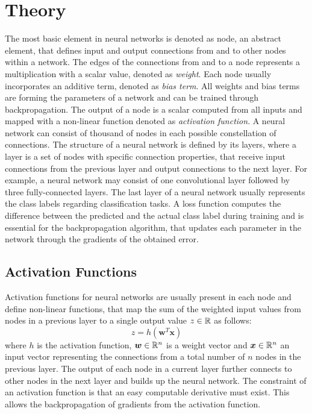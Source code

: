 
\section{Theory}\label{sec:nn_theory}
The most basic element in neural networks is denoted as node, an abstract element, that defines input and output connections from and to other nodes within a network.
The edges of the connections from and to a node represents a multiplication with a scalar value, denoted as \emph{weight}.
Each node usually incorporates an additive term, denoted as \emph{bias term}.
All weights and bias terms are forming the parameters of a network and can be trained through backpropagation.
The output of a node is a scalar computed from all inputs and mapped with a non-linear function denoted as \emph{activation function}.
A neural network can consist of thousand of nodes in each possible constellation of connections.
The structure of a neural network is defined by its layers, where a layer is a set of nodes with specific connection properties, that receive input connections from the previous layer and output connections to the next layer.
For example, a neural network may consist of one convolutional layer followed by three fully-connected layers.
The last layer of a neural network usually represents the class labels regarding classification tasks.
A loss function computes the difference between the predicted and the actual class label during training and is essential for the backpropagation algorithm, that updates each parameter in the network through the gradients of the obtained error.



\subsection{Activation Functions}\label{sec:nn_theory_acti}
Activation functions for neural networks are usually present in each node and define non-linear functions, that map the sum of the weighted input values from nodes in a previous layer to a single output value $z \in \mathbb{R}$ as follows:
\begin{equation}\label{eq:nn_theory_acti}
  z = h(\bm{w}^T \bm{x})
\end{equation}
where $h$ is the activation function, $\bm{w} \in \mathbb{R}^n$ is a weight vector and $\bm{x} \in \mathbb{R}^n$ an input vector representing the connections from a total number of $n$ nodes in the previous layer.
The output of each node in a current layer further connects to other nodes in the next layer and builds up the neural network.
The constraint of an activation function is that an easy computable derivative must exist.
This allows the backpropagation of gradients from the activation function.

